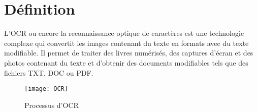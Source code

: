 \section{Définition}
L'OCR ou encore la reconnaissance optique de caractères est une technologie complexe qui convertit les images contenant du texte en formats avec du texte modifiable. Il permet de traiter des livres numérisés, des captures d'écran et des photos contenant du texte et d'obtenir des documents modifiables tels que des fichiers TXT, DOC ou PDF.
\begin{figure}[H]
    \centering
    \texttt{[image: OCR]}
    \caption{Processus d'OCR}
\end{figure}